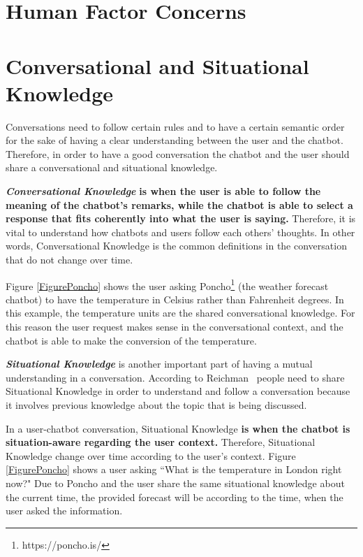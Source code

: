 \documentclass[a4paper,10pt]{article}
\begin{document}
\section*{Human Factor Concerns}

\section{Conversational and Situational Knowledge}

Conversations need to follow certain rules and to have a certain semantic order for the sake of having a clear understanding between the user and the chatbot. Therefore, in order to have a good conversation the chatbot and the user should share a conversational and situational knowledge. 


\textbf{\textit{Conversational Knowledge}} \textbf{is when the user is able to follow the meaning of the chatbot's remarks, while the chatbot is able to select a response that fits coherently into what the user is saying.} Therefore, it is vital to understand how chatbots and users follow each others' thoughts. In other words, Conversational Knowledge is the common definitions in the conversation that do not change over time. 

Figure \ref{FigurePoncho} shows the user asking Poncho\footnote{https://poncho.is/} (the weather forecast chatbot) to have the temperature in Celsius rather than Fahrenheit degrees. In this example, the temperature units are the shared conversational knowledge. For this reason the user request makes sense in the conversational context, and the chatbot is able to make the conversion of the temperature.     


\textbf{\textit{Situational Knowledge}} is another important part of having a mutual understanding in a conversation. According to Reichman~\cite{reichman1985getting} people need to share Situational Knowledge in order to understand and follow a conversation because it involves previous knowledge about the topic that is being discussed.  

In a user-chatbot conversation, Situational Knowledge \textbf{is when the chatbot is situation-aware regarding the user context.} Therefore, Situational Knowledge change over time according to the user's context. Figure \ref{FigurePoncho} shows a user asking ``What is the temperature in London right now?" Due to Poncho and the user share the same situational knowledge about the current time, the provided forecast will be according to the time, when the user asked the information. 
\end{document}
